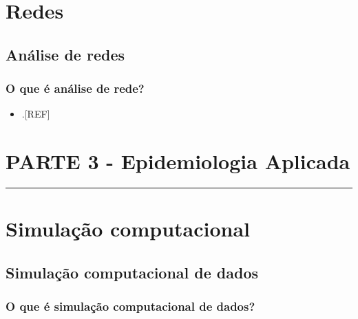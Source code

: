 \documentclass[
  a4paper,
]{book}
\providecommand{\tightlist}{%
  \setlength{\itemsep}{0pt}\setlength{\parskip}{0pt}}
\begin{document}
\hypertarget{analise-redes}{%
\chapter{\texorpdfstring{\textbf{Redes}}{Redes}}\label{analise-redes}}

\hypertarget{redes}{%
\section{Análise de redes}\label{redes}}

\hypertarget{o-que-uxe9-anuxe1lise-de-rede}{%
\subsection{O que é análise de rede?}\label{o-que-uxe9-anuxe1lise-de-rede}}

\begin{itemize}
\tightlist
\item
  .{[}REF{]}
\end{itemize}


\hypertarget{parte-3---epidemiologia-aplicada}{%
\chapter*{\texorpdfstring{\textbf{PARTE 3 - Epidemiologia Aplicada}}{PARTE 3 - Epidemiologia Aplicada}}\label{parte-3---epidemiologia-aplicada}}

\markboth{}{}
\par\noindent\rule{\textwidth}{0.05in}

\hypertarget{simulacao-computacional}{%
\chapter{\texorpdfstring{\textbf{Simulação computacional}}{Simulação computacional}}\label{simulacao-computacional}}

\hypertarget{simulacao-computacional-dados}{%
\section{Simulação computacional de dados}\label{simulacao-computacional-dados}}

\hypertarget{o-que-uxe9-simulauxe7uxe3o-computacional-de-dados}{%
\subsection{O que é simulação computacional de dados?}\label{o-que-uxe9-simulauxe7uxe3o-computacional-de-dados}}
\end{document}
